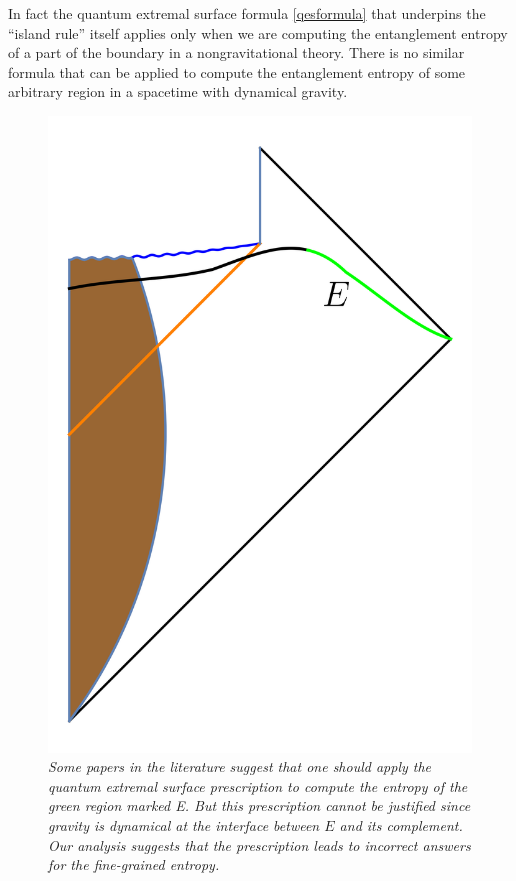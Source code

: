 \documentclass[12pt]{article}
\begin{document}
In fact the quantum extremal surface formula \eqref{qesformula} that underpins  the ``island rule'' itself applies only when we are computing the entanglement entropy of
a part of the boundary in a nongravitational theory. There is no similar formula that can be applied to compute the entanglement entropy of some arbitrary region in a spacetime with dynamical gravity.
\begin{figure}[!ht]
\begin{center}
\includegraphics[height=0.5\textheight]{randomdivision.png}
\caption{\em Some papers in the literature suggest that one should apply the quantum extremal surface prescription to compute the entropy of the green region marked E. But this prescription cannot be justified since gravity is dynamical at the interface between $E$ and its complement. Our analysis suggests that the prescription leads to incorrect answers for the fine-grained entropy. \label{randomdivision}}
\end{center}
\end{figure}
\end{document}
